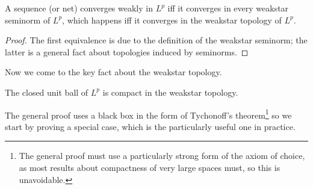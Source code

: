 \begin{lemma}
A sequence (or net) converges weakly in $L^p$ iff it converges in every weakstar seminorm of $L^p$, which happens iff it converges in the weakstar topology of $L^p$.
\end{lemma}
\begin{proof}
The first equivalence is due to the definition of the weakstar seminorm; the latter is a general fact about topologies induced by seminorms.
\end{proof}

Now we come to the key fact about the weakstar topology.

\begin{theoremx}
The closed unit ball of $L^p$ is compact in the weakstar topology.
\end{theoremx}

The general proof uses a black box in the form of Tychonoff's theorem\footnote{The general proof must use a particularly strong form of the axiom of choice, as most results about compactness of very large spaces must, so this is unavoidable.} so we start by proving a special case, which is the particularly useful one in practice.

